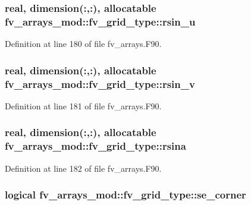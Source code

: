 \subsubsection[{rsin\-\_\-u}]{\setlength{\rightskip}{0pt plus 5cm}real, dimension(\-:,\-:), allocatable fv\-\_\-arrays\-\_\-mod\-::fv\-\_\-grid\-\_\-type\-::rsin\-\_\-u}\label{structfv__arrays__mod_1_1fv__grid__type_a28cfd8dc8c410d88a05c5c278643f76b}


Definition at line 180 of file fv\-\_\-arrays.\-F90.

\subsubsection[{rsin\-\_\-v}]{\setlength{\rightskip}{0pt plus 5cm}real, dimension(\-:,\-:), allocatable fv\-\_\-arrays\-\_\-mod\-::fv\-\_\-grid\-\_\-type\-::rsin\-\_\-v}\label{structfv__arrays__mod_1_1fv__grid__type_a97dd5675fd3857c4a44ea673984bb618}


Definition at line 181 of file fv\-\_\-arrays.\-F90.

\subsubsection[{rsina}]{\setlength{\rightskip}{0pt plus 5cm}real, dimension(\-:,\-:), allocatable fv\-\_\-arrays\-\_\-mod\-::fv\-\_\-grid\-\_\-type\-::rsina}\label{structfv__arrays__mod_1_1fv__grid__type_a97d2a9ff82ba04efc2bb3747b0889bc0}


Definition at line 182 of file fv\-\_\-arrays.\-F90.

\subsubsection[{se\-\_\-corner}]{\setlength{\rightskip}{0pt plus 5cm}logical fv\-\_\-arrays\-\_\-mod\-::fv\-\_\-grid\-\_\-type\-::se\-\_\-corner}\label{structfv__arrays__mod_1_1fv__grid__type_ab5b5bee5687310964c05b317f0741d83}


